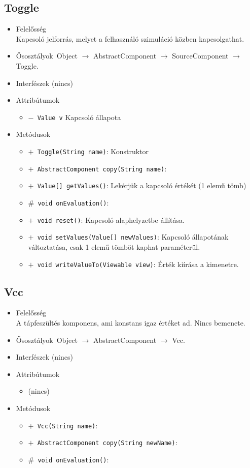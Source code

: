 \subsection{Toggle}
\begin{itemize}
\item Felelősség\\
Kapcsoló jelforrás, melyet a felhasználó szimuláció közben kapcsolgathat.
\item Ősosztályok\ Object $\rightarrow{}$ AbstractComponent $\rightarrow{}$ SourceComponent $\rightarrow{}$ Toggle.
\item Interfészek (nincs)
\item Attribútumok $\ $
\begin{itemize}
	\item[] \texttt{$-$ Value v} Kapcsoló állapota
\end{itemize}
\item Metódusok$\ $
\begin{itemize}
	\item[] \texttt{$+$ Toggle(String name)}: Konstruktor
	\item[] \texttt{$+$ AbstractComponent copy(String name)}: 
	\item[] \texttt{$+$ Value[] getValues()}: Lekérjük a kapcsoló értékét (1 elemű tömb)
	\item[] \texttt{$\#$ void onEvaluation()}: 
	\item[] \texttt{$+$ void reset()}: Kapcsoló alaphelyzetbe állítása.
	\item[] \texttt{$+$ void setValues(Value[] newValues)}: Kapcsoló állapotának változtatása, csak 1 elemű tömböt kaphat paraméterül.
	\item[] \texttt{$+$ void writeValueTo(Viewable view)}: Érték kiírása a kimenetre.
\end{itemize}
\end{itemize}

\subsection{Vcc}
\begin{itemize}
\item Felelősség\\
A tápfeszültés komponens, ami konstans igaz értéket ad. Nincs bemenete.
\item Ősosztályok\ Object $\rightarrow{}$ AbstractComponent $\rightarrow{}$ Vcc.
\item Interfészek (nincs)
\item Attribútumok $\ $
\begin{itemize}
\item (nincs)
\end{itemize}
\item Metódusok$\ $
\begin{itemize}
	\item[] \texttt{$+$ Vcc(String name)}: 
	\item[] \texttt{$+$ AbstractComponent copy(String newName)}: 
	\item[] \texttt{$\#$ void onEvaluation()}: 
\end{itemize}
\end{itemize}

